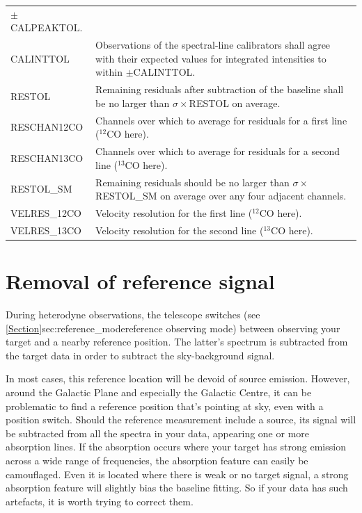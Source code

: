 \documentclass[11pt,oneside,chapters]{starlink}
\begin{document}
\begin{table}[h!]
\begin{tabular}{|p{4.0cm}|p{11.0cm}|}
                 $\pm$CALPEAKTOL.\\
CALINTTOL      & Observations of the spectral-line calibrators shall agree with
                 their expected values for integrated intensities to within
                 $\pm$CALINTTOL. \\
RESTOL         & Remaining residuals after subtraction of the baseline shall be
                 no larger than $\sigma\times$RESTOL on average. \\
RESCHAN12CO    & Channels over which to average for residuals for a first line
                 ($^{12}$CO here).\\
RESCHAN13CO    & Channels over which to average for residuals for a second line
                 ($^{13}$CO here).\\
RESTOL\_SM     & Remaining residuals should be no larger than
                 $\sigma\times$RESTOL\_SM on average over any four adjacent
                 channels. \\
VELRES\_12CO   & Velocity resolution for the first line ($^{12}$CO here). \\
VELRES\_13CO   & Velocity resolution for the second line ($^{13}$CO here). \\
\hline
\end{tabular}
\end{table}


\chapter{Removal of reference signal}
\label{app:remove_ref_signal}

During heterodyne observations, the telescope switches (see
\cref{Section}{sec:reference_mode}{reference observing mode}) between
observing your target and a nearby reference position.  The latter's
spectrum is subtracted from the target data in order to subtract the
sky-background signal.

In most cases, this reference location will be devoid of source
emission.  However, around the Galactic Plane and especially the
Galactic Centre, it can be problematic to find a reference position
that's pointing at sky, even with a position switch.  Should the
reference measurement include a source, its signal will be subtracted
from all the spectra in your data, appearing one or more absorption
lines.  If the absorption occurs where your target has strong emission
across a wide range of frequencies, the absorption feature can easily
be camouflaged.  Even it is located where there is weak or no target
signal, a strong absorption feature will slightly bias the baseline
fitting.  So if your data has such artefacts, it is worth trying to
correct them.
\end{document}
